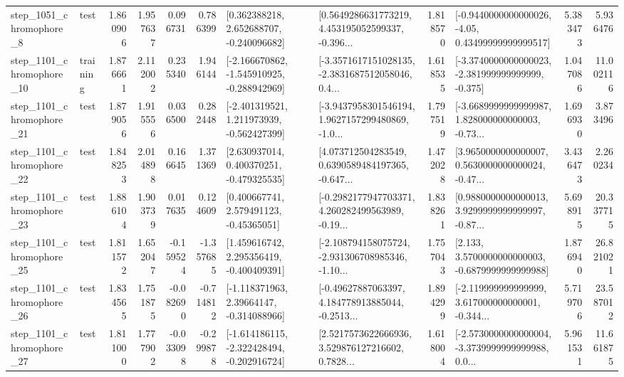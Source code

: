 \begin{tabular}{llrrrrllrlrr}
  step\_1051\_chromophore\_8 &      test &      1.860906 &    1.957637 &      0.096731 &  0.786399 &    [0.362388218, 2.652688707, -0.240096682] &  [0.5649286631773219, 4.453195052599337, -0.396... &       1.818570 &  [-0.9440000000000026, -4.05, 0.43499999999999517] &            5.383473 &          5.936476 \\
 step\_1101\_chromophore\_10 &  training &      1.876661 &    2.112002 &      0.235340 &  1.946144 &  [-2.166670862, -1.545910925, -0.288942969] &  [-3.3571617151028135, -2.3831687512058046, 0.4... &       1.618535 &  [-3.3740000000000023, -2.381999999999999, -0.375] &            1.047086 &         11.002116 \\
 step\_1101\_chromophore\_21 &      test &      1.879056 &    1.915556 &      0.036500 &  0.282448 &   [-2.401319521, 1.211973939, -0.562427399] &  [-3.9437958301546194, 1.9627157299480869, -1.0... &       1.797519 &  [-3.6689999999999987, 1.828000000000003, -0.73... &            1.696930 &          3.873496 \\
 step\_1101\_chromophore\_22 &      test &      1.848253 &    2.014898 &      0.166645 &  1.371369 &    [2.630937014, 0.400370251, -0.479325535] &  [4.073712504283549, 0.6390589484197365, -0.647... &       1.472028 &  [3.9650000000000007, 0.5630000000000024, -0.47... &            3.436473 &          2.260234 \\
 step\_1101\_chromophore\_23 &      test &      1.886104 &    1.903739 &      0.017635 &  0.124609 &     [0.400667741, 2.579491123, -0.45365051] &  [-0.2982177947703371, 4.260282499563989, -0.19... &       1.838261 &  [0.9880000000000013, 3.9299999999999997, -0.87... &            5.698915 &         20.337715 \\
 step\_1101\_chromophore\_25 &      test &      1.811572 &    1.652047 &     -0.159524 & -1.357685 &    [1.459616742, 2.295356419, -0.400409391] &  [-2.108794158075724, -2.931306708985346, -1.10... &       1.757043 &   [2.133, 3.5700000000000003, -0.6879999999999988] &            1.876940 &         26.821021 \\
 step\_1101\_chromophore\_26 &      test &      1.834565 &    1.751875 &     -0.082690 & -0.714812 &    [-1.118371963, 2.39664147, -0.314088966] &  [-0.49627887063397, 4.184778913885044, -0.2513... &       1.894299 &  [-2.119999999999999, 3.617000000000001, -0.344... &            5.719706 &         23.587012 \\
 step\_1101\_chromophore\_27 &      test &      1.811000 &    1.777902 &     -0.033098 & -0.299878 &  [-1.614186115, -2.322428494, -0.202916724] &  [2.5217573622666936, 3.529876127216602, 0.7828... &       1.618004 &  [-2.5730000000000004, -3.3739999999999988, 0.0... &            5.961531 &         11.661875 \\

\end{tabular}
